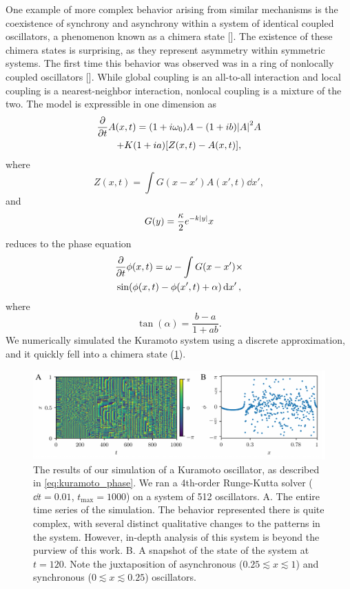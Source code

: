 One example of more complex behavior arising from similar mechanisms is the coexistence of synchrony and asynchrony within a system of identical coupled oscillators, a phenomenon known as a chimera state [].
The existence of these chimera states is surprising, as they represent asymmetry within symmetric systems.
The first time this behavior was observed was in a ring of nonlocally coupled oscillators [].
While global coupling is an all-to-all interaction and local coupling is a nearest-neighbor interaction, nonlocal coupling is a mixture of the two.
The model is expressible in one dimension as
\begin{multline}
  \label{eq:kuramoto}
  \pdv{t} A(x, t)
  =
  \pqty{1 + i \omega_{0}} A
  -
  \pqty{1 + i b} \abs{A}^{2} A \\
  +
  K \pqty{1 + i a} \bqty{Z(x, t) - A(x, t)},
\end{multline}
where
\begin{equation*}
  \label{eq:kuramoto_coupling}
  Z(x, t)
  =
  \int{G(x - x') A(x', t) \dd{x'}},
\end{equation*}
and
\begin{equation*}
  G(y)
  =
  \frac{\kappa}{2} e^{-k \abs{y}}x
\end{equation*}
 reduces to the phase equation
\begin{multline}
  \label{eq:kuramoto_phase}
  \pdv{t} \phi(x, t)
  =
  \omega
  -
  \int G(x - x') \times \\
  \sin(\phi(x, t) - \phi(x', t) + \alpha) \dd{x'},
\end{multline}
where
\begin{equation}
  \tan(\alpha)
  =
  \frac{b - a}{1 + a b}.
\end{equation}
We numerically simulated the Kuramoto system using a discrete approximation, and it quickly fell into a chimera state (\cref{fig:kuramoto}).
\begin{figure}[ht]
  \centering
  \includegraphics[width=\textwidth]{figure/kuramoto.pdf}
  \caption[Kuramoto simulation]{The results of our simulation of a Kuramoto oscillator, as described in \cref{eq:kuramoto_phase}.
    We ran a 4th-order Runge-Kutta solver ($\dd{t} = 0.01$, $t_{\text{max}} = 1000$) on a system of 512 oscillators.
    A. The entire time series of the simulation.
    The behavior represented there is quite complex, with several distinct qualitative changes to the patterns in the system.
    However, in-depth analysis of this system is beyond the purview of this work.
    B. A snapshot of the state of the system at $t = 120$.
    Note the juxtaposition of asynchronous ($0.25 \lesssim x \lesssim 1$) and synchronous ($0 \lesssim x \lesssim 0.25$) oscillators.
  }
  \label{fig:kuramoto}
\end{figure}

